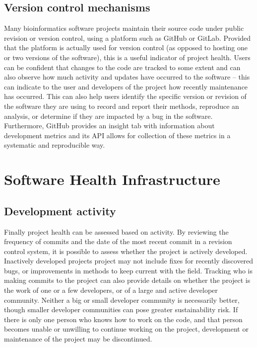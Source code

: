 \documentclass{article}
\begin{document}
\subsection{Version control mechanisms}
Many bioinformatics software projects maintain their source code under public revision or version control, using a platform such as GitHub or GitLab. Provided that the platform is actually used for version control (as opposed to hosting one or two versions of the software), this is a useful indicator of project health. Users can be confident that changes to the code are tracked to some extent and can also observe how much activity and updates have occurred to the software -- this can indicate to the user and developers of the project how recently maintenance has occurred. This can also help users identify the specific version or revision of the software they are using to record and report their methods, reproduce an analysis, or determine if they are impacted by a bug in the software. Furthermore, GitHub provides an insight tab with information about development metrics and its API allows for collection of these metrics in a systematic and reproducible way. 

\section{Software Health Infrastructure}
\label{sec-supp-note-health-inf}

\subsection{Development activity}
Finally project health can be assessed based on activity. By reviewing the frequency of commits and the date of the most recent commit in a revision control system, it is possible to assess whether the project is actively developed. Inactively developed projects project may not include fixes for recently discovered bugs, or improvements in methods to keep current with the field. Tracking who is making commits to the project can also provide details on whether the project is the work of one or a few developers, or of a large and active developer community. Neither a big or small developer community is necessarily better, though smaller developer communities can pose greater sustainability risk. If there is only one person who knows how to work on the code, and that person becomes unable or unwilling to continue working on the project, development or maintenance of the project may be discontinued. 
\end{document}
